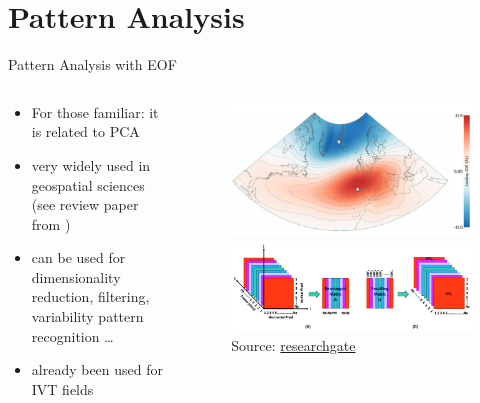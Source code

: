 \section{Pattern Analysis}

\begin{frame}{Pattern Analysis with EOF}
  \begin{columns}
    \begin{column}{.5\textwidth}
      \begin{itemize}
        \item For those familiar: it is related to PCA
        \item very widely used in geospatial sciences (see review paper from \citeauthor{hannachi_empirical_2007} \cite{hannachi_empirical_2007})
        \item can be used for dimensionality reduction, filtering, variability pattern recognition \dots
        \item already been used for IVT fields \cite{ayantobo_integrated_2022, salstein_modes_1983, jiang_water_2009}
      \end{itemize} 
      
    \end{column}
    \begin{column}{.5\textwidth}
    \begin{figure}[t]
      \centering
      \includegraphics[width=.7\columnwidth]{imglib/nao_eof_index.png}\\
      \includegraphics[width=.9 \columnwidth]{imglib/eof_matrix_decomp.png}
      {\tiny Source: \href{https://www.researchgate.net/publication/357212141_Latest_Advances_in_Common_Signal_Processing_of_Pulsed_Thermography_for_Enhanced_Detectability_A_Review/figures?lo=1}{researchgate}}
    \end{figure}

    \end{column}
    
  \end{columns}
\end{frame}

